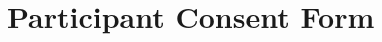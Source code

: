 \documentclass[a4paper]{article}
\begin{document}
\section{Participant Consent Form}
\label{appendix_participant_consent_form}
\end{document}
